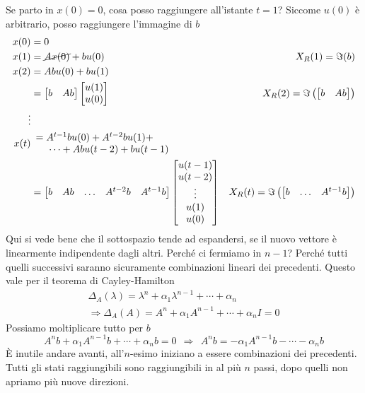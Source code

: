 \documentclass[10pt,a4paper]{book}
\begin{document}
Se parto in $x(0) =0$, cosa posso raggiungere all'istante $t=1$? Siccome $u(0)$ è arbitrario, posso raggiungere l'immagine di $b$
\begin{equation*}
	\begin{aligned}
		x(0) & =0 & \\
		x(1) & =\cancel{Ax(0)} +bu(0) & X_R(1) =\Im(b)\\
		x(2) & =Abu(0) +bu(1) & \\
		& =\begin{bmatrix}
		b & Ab
		\end{bmatrix}\begin{bmatrix}
		u(1)\\
		u(0)
		\end{bmatrix} & X_R(2) =\Im\left(\begin{bmatrix}
		b & Ab
		\end{bmatrix}\right)\\
		\vdots  &  & \\
		x(t) &  \begin{array}{l}
		=A^{t-1} bu(0) +A^{t-2} bu(1) +\\
		\ \ \ \ \cdots +Abu(t-2) +bu(t-1)
		\end{array} & \\
		& =\begin{bmatrix}
		b & Ab & \dotsc & A^{t-2} b & A^{t-1} b 
		\end{bmatrix}\begin{bmatrix}
		u(t-1)\\
		u(t-2)\\
		\vdots \\
		u(1)\\
		u(0)
		\end{bmatrix} & X_R(t) =\Im\left(\begin{bmatrix}
		b & \dotsc  & A^{t-1} b
		\end{bmatrix}\right)
	\end{aligned}
\end{equation*}
Qui si vede bene che il sottospazio tende ad espandersi, se il nuovo vettore è linearmente indipendente dagli altri. Perché ci fermiamo in $n-1$? Perché tutti quelli successivi saranno sicuramente combinazioni lineari dei precedenti. Questo vale per il teorema di Cayley-Hamilton
\begin{gather*}
	\Delta _A(\lambda) =\lambda ^n +\alpha _1 \lambda ^{n-1} +\cdots +\alpha _n\\
	\Rightarrow \Delta _A(A) =A^n +\alpha _1 A^{n-1} +\cdots +\alpha _n I=0
\end{gather*}
Possiamo moltiplicare tutto per $b$
\begin{equation*}
	A^n b+\alpha _1 A^{n-1} b+\cdots +\alpha _n b=0\ \ \Rightarrow \ \ A^n b=-\alpha _1 A^{n-1} b-\cdots -\alpha _n b
\end{equation*}
È inutile andare avanti, all'$n$-esimo iniziano a essere combinazioni dei precedenti. Tutti gli stati raggiungibili sono raggiungibili in al più $n$ passi, dopo quelli non apriamo più nuove direzioni.
\end{document}
